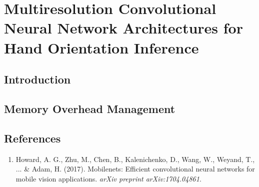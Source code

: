 \documentclass{article}
\begin{document}
\section*{Multiresolution Convolutional Neural Network Architectures for Hand Orientation Inference}

\subsection*{Introduction}

\subsection*{Memory Overhead Management}

\subsection*{References}
\begin{enumerate}
\item Howard, A. G., Zhu, M., Chen, B., Kalenichenko, D., Wang, W., Weyand, T., ... \& Adam, H. (2017). Mobilenets: Efficient convolutional neural networks for mobile vision applications. \emph{arXiv preprint arXiv:1704.04861}.
\end{enumerate}
\end{document}
